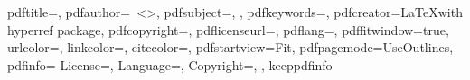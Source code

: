 \hypersetup
{
  pdftitle={\myBookTitle},
  pdfauthor={\myAuthorFullName~\textless\href{mailto:\myAuthorEmail}{\myAuthorEmail}\textgreater},
  pdfsubject={\myDegreefull, \myWorkTypeFull},
  pdfkeywords={\keywordsforpdf},
  pdfcreator={\LaTeX with hyperref package},
  pdfcopyright={\myCopyrightStatement},
  pdflicenseurl={\myLicenseURL},
  pdflang={\mypdflang},
  pdffitwindow={true},
  urlcolor=\myurlcolor,
  linkcolor=\mylinkcolor,
  citecolor=\mycitecolor,
  pdfstartview=Fit,
  pdfpagemode=UseOutlines,
  pdfinfo={
    License={\myLicenseURL},
    Language={\mypdflang},
    Copyright={\myCopyrightStatement},
  },
  keeppdfinfo %
}


\usepackage{tocloft}
\renewcommand{\cftpartfont}{\large\bfseries\scshape}
\renewcommand{\cftpartpresnum}{\partname\space}
\renewcommand{\cftpartaftersnum}{\quad}
\setlength{\cftpartnumwidth}{7em}
\setlength{\cftbeforefigskip}{6pt} %


{
\newcommand{\videoLink}[2]{%
  \refstepcounter{videos}%
  \phantomsection%
  \addcontentsline{vdo}{videos}{\protect\numberline{\thechapter.\thevideos}#1 (\href{#2}{link to video})}\href{#2}{#1}}
}
{
\newcommand{\videoLink}[2]{%
  \refstepcounter{videos}%
  \phantomsection%
  \addcontentsline{vdo}{videos}{\protect\numberline{\thechapter.\thevideos}#1 (\href{#2}{enlace al vídeo})}\href{#2}{#1}}
}



